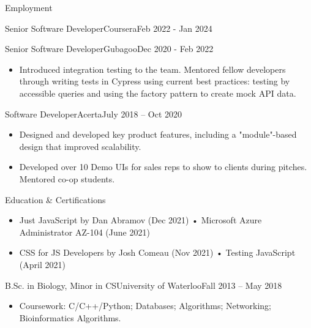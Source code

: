 \documentclass[]{mcdowellcv}
\begin{document}
\begin{cvsection}{Employment}
\begin{cvsubsection}{Senior Software Developer}{Coursera}{Feb 2022 - Jan 2024}
	        \end{cvsubsection}
	        
		\begin{cvsubsection}{Senior Software Developer}{Gubagoo}{Dec 2020 - Feb 2022}
 			\begin{itemize}
 			    \item Introduced integration testing to the team. Mentored fellow developers through writing tests in Cypress using current best practices: testing by accessible queries and using the factory pattern to create mock API data.
			\end{itemize}
		\end{cvsubsection}
		
		\begin{cvsubsection}{Software Developer}{Acerta}{July 2018 -- Oct 2020}
			\begin{itemize}
				\item Designed and developed key product features, including a "module"-based design that improved scalability.
				\item Developed over 10 Demo UIs for sales reps to show to clients during pitches. Mentored co-op students.
			\end{itemize}
		\end{cvsubsection}

	\end{cvsection}

	\begin{cvsection}{Education \& Certifications}
		\begin{cvsubsection}{}{}{}
			\begin{itemize}
			    \item Just JavaScript by Dan Abramov (Dec 2021)  \hspace{1.41cm} • Microsoft Azure Administrator AZ-104 (June 2021)
			    \item CSS for JS Developers by Josh Comeau (Nov 2021) \hspace{0.25cm} • Testing JavaScript (April 2021)
			\end{itemize}
		\end{cvsubsection}
		\begin{cvsubsection}{B.Sc. in Biology, Minor in CS}{University of Waterloo}{Fall 2013 -- May 2018}
			\begin{itemize}
				\item Coursework: C/C++/Python; Databases; Algorithms; Networking; Bioinformatics Algorithms.
			\end{itemize}
		\end{cvsubsection}
	\end{cvsection}
\end{document}
